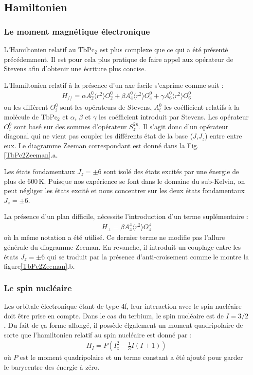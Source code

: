 \subsection{Hamiltonien}

\subsubsection{Le moment magnétique électronique}
L'Hamiltonien relatif au TbPc$_2$ est plus complexe que ce qui a été présenté précédemment. Il est pour cela plus pratique de faire appel aux opérateur de Stevens afin d'obtenir une écriture plus concise.

L'Hamiltonien relatif à la présence d'un axe facile s'exprime comme suit :
\begin{eqnarray}
H_{//} = \alpha A_2^0 \langle r^2 \rangle O_2^0 + \beta A_4^0 \langle r^2 \rangle O_4^0 + \gamma A_6^0 \langle r^2 \rangle O_6^0
\end{eqnarray}
ou les différent $O_i^0$ sont les opérateurs de Stevens, $A_i^0$ les coéfficient relatifs à la molécule de TbPc$_2$ et $\alpha$, $\beta$ et $\gamma$ les coéfficient introduit par Stevens. Les opérateur $O^0_i$ sont basé sur des sommes d'opérateur $S_z^{2n}$. Il s'agit donc d'un opérateur diagonal qui ne vient pas coupler les différents état de la base ($J$,$J_z$) entre entre eux. Le diagramme Zeeman correspondant est donné dans la Fig.\ref{TbPc2Zeeman}.a.

Les états fondamentaux $J_z = \pm 6$ sont isolé des états excités par une énergie de plus de $600$\,K. Puisque nos expérience se font dans le domaine du sub-Kelvin, on peut négliger les états excité et nous concentrer sur les deux états fondamentaux  $J_z = \pm 6$.

La présence d'un plan difficile, nécessite l'introduction d'un terme suplémentaire :
\begin{eqnarray}
H_{\perp} = \beta A_4^4 \langle r^2 \rangle O_4^4
\end{eqnarray}
où la m\^eme notation a été utilisé. Ce dernier terme ne modifie pas l'allure générale du diagramme Zeeman. En revanche, il introduit un couplage entre les états  $J_z = \pm 6$ qui se traduit par la présence d'anti-croisement comme le montre la figure\ref{TbPc2Zeeman}.b.

\subsubsection{Le spin nucléaire}
Les orbitale électronique étant de type 4f, leur interaction avec le spin nucléaire doit \^etre prise en compte. Dans le cas du terbium, le spin nucléaire est de $I = 3/2$. Du fait de ça forme allongé, il possède élgalement un moment quadripolaire de sorte que l'hamiltonien relatif au spin nucléaire est donné par :
\begin{eqnarray}
H_I = P\left(I_z^2 - \frac{1}{3}I(I+1)\right)
\end{eqnarray}
où $P$ est le moment quadripolaire et un terme constant a été ajouté pour garder le barycentre des énergie à zéro.

